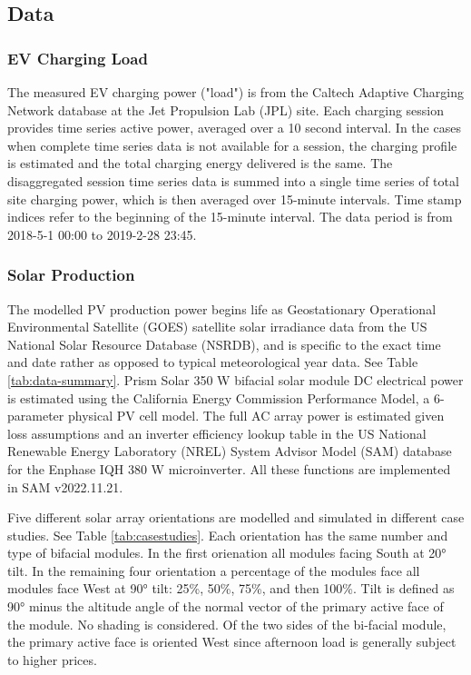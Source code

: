 \documentclass[
]{article}
\begin{document}
\hypertarget{data}{%
  \subsection{Data}\label{data}}

\hypertarget{ev-charging-load}{%
  \subsubsection{\texorpdfstring{EV Charging Load
    }{EV Charging Load }}\label{ev-charging-load}}

The measured EV charging power ("load") is from the Caltech Adaptive
Charging Network database at the Jet Propulsion Lab (JPL) site. Each
charging session provides time series active power, averaged over a 10
second interval. In the cases when complete time series data is not
available for a session, the charging profile is estimated and the total
charging energy delivered is the same. The disaggregated session time
series data is summed into a single time series of total site charging
power, which is then averaged over 15-minute intervals. Time stamp
indices refer to the beginning of the 15-minute interval. The data
period is from 2018-5-1 00:00 to 2019-2-28 23:45.

\hypertarget{solar-production}{%
  \subsubsection{Solar Production}\label{solar-production}}

The modelled PV production power begins life as Geostationary
Operational Environmental Satellite (GOES) satellite solar irradiance
data from the US National Solar Resource Database (NSRDB), and is
specific to the exact time and date rather as opposed to typical
meteorological year data. See Table \ref{tab:data-summary}. Prism Solar 350 W bifacial solar module DC
electrical power is estimated using the California Energy Commission
Performance Model, a 6-parameter physical PV cell model. The full AC
array power is estimated given loss assumptions and an inverter
efficiency lookup table in the US National Renewable Energy Laboratory
(NREL) System Advisor Model (SAM) database for the Enphase IQH 380 W
microinverter. All these functions are implemented in SAM v2022.11.21.

Five different solar array orientations are modelled and simulated in
different case studies. See Table \ref{tab:casestudies}. Each orientation has the same number and type of bifacial
modules. In the first orienation all modules facing South at 20° tilt. In the remaining four
orientation a percentage of the modules face all modules face West at 90° tilt: 25\%, 50\%, 75\%, and then 100\%.
Tilt is defined as 90° minus the altitude angle of the normal vector of the primary active face of 
the module. No shading is considered. Of the two sides of the bi-facial module, the primary active 
face is oriented West since afternoon load is generally subject to higher prices.
\end{document}
